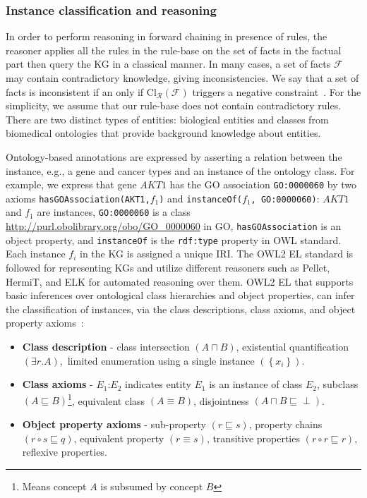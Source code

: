 \subsubsection{Instance classification and reasoning}
In order to perform reasoning in forward chaining in presence of rules, the reasoner applies all the rules in the rule-base on the set of facts in the factual part then query the KG in a classical manner.
In many cases, a set of facts $\mathcal{F}$ may contain contradictory knowledge, giving inconsistencies. We say that a set of facts is inconsistent if an only if  $\mathrm{Cl}_{\mathcal{R}}(\mathcal{F})$ triggers a negative constraint~\cite{garoufallou2016metadata}. For the simplicity, we assume that our rule-base does not contain contradictory rules. There are two distinct types of entities: biological entities and classes from biomedical ontologies that provide background knowledge about entities. 

\hspace*{3.5mm} Ontology-based annotations are expressed by asserting a relation between the instance, e.g., a gene and cancer types and an instance of the ontology class. For example, we express that gene $AKT1$ has the GO association \texttt{GO:0000060} by two axioms \texttt{hasGOAssociation(AKT1,$f_1$)} and \texttt{instanceOf($f_1$, GO:0000060)}: $AKT1$ and $f_1$ are instances, \texttt{GO:0000060} is a class \url{http://purl.obolibrary.org/obo/GO\_0000060} in GO, \texttt{hasGOAssociation} is an object property, and \texttt{instanceOf} is the \texttt{rdf:type} property in OWL standard. Each instance $f_i$ in the KG is assigned a unique IRI. The OWL2 EL standard is followed for representing KGs and utilize different reasoners such as Pellet, HermiT, and ELK for automated reasoning over them. OWL2 EL that supports basic inferences over ontological class hierarchies and object properties, can infer the classification of instances, via  the class descriptions, class axioms, and object property axioms~\cite{alshahrani2017neuro}: 

\begin{itemize}[noitemsep]
\vspace{-2mm}
    \item \textbf{Class description} - class intersection $(A \sqcap B)$, existential quantification $(\exists r . A),$ limited enumeration using a single instance $\left(\left\{x_{i}\right\}\right)$. 
    \item \textbf{Class axioms} - $E_{1}$:$E_{2}$ indicates entity $E_{1}$ is an instance of class $E_{2}$, subclass $(A \sqsubseteq B)$\footnote{Means concept $A$ is subsumed by concept $B$}, equivalent class $(A \equiv B)$, disjointness $(A \sqcap B \sqsubseteq \perp)$. 
    \item \textbf{Object property axioms} - sub-property $(r \sqsubseteq s)$, property chains $(r \circ s \sqsubseteq q)$, equivalent property $(r \equiv s)$, transitive properties $(r \circ r \sqsubseteq r)$, reflexive properties. 
    \vspace{-2mm}
\end{itemize}

